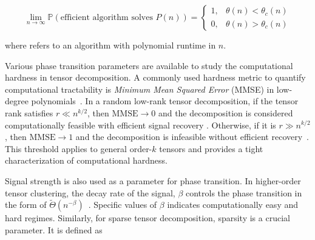 \[
\lim_{n \to \infty} \mathbb{P}(\text{efficient algorithm solves } P(n)) = \begin{cases} 1, & \theta(n) < \theta_c(n) \\ 0, & \theta(n) > \theta_c(n) \end{cases}
\]

where  refers to an algorithm with polynomial runtime in $n$.

Various phase transition parameters are available to study the computational hardness in tensor decomposition. A commonly used hardness metric to quantify computational tractability is \textit{Minimum Mean Squared Error} (MMSE) in low-degree polynomials~\cite{wein2023average}. In a random low-rank tensor decomposition, if the tensor rank satisfies $r \ll n^{k/2}$, then $\text{MMSE} \to 0$ and the decomposition is considered computationally feasible with efficient signal recovery . Otherwise, if it is $r \gg n^{k/2}$, then $\text{MMSE} \to 1$ and the decomposition is infeasible without efficient recovery~\cite{wein2023average}. This threshold applies to general order-$k$ tensors and provides a tight characterization of computational hardness.


Signal strength is also used as a parameter for phase transition. In higher-order tensor clustering, the decay rate of the signal, $\beta$ controls the phase transition in the form of $\tilde{\Theta}(n^{-\beta})$~\cite{luo2022tensor}. Specific values of $\beta$ indicates computationally easy and hard regimes. 
Similarly, for sparse tensor decomposition, sparsity is a crucial parameter. It is defined as 

